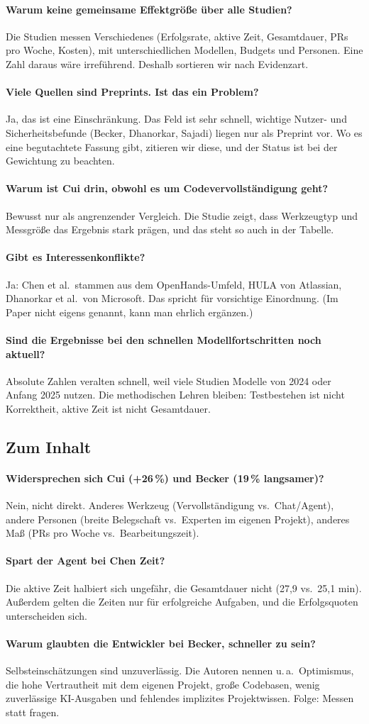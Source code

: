 \documentclass[11pt,a4paper,parskip=half]{scrartcl}
\newcommand{\frage}[2]{\paragraph{#1}#2\par}
\begin{document}
\frage{Warum keine gemeinsame Effektgröße über alle Studien?}{Die Studien messen Verschiedenes (Erfolgsrate, aktive Zeit, Gesamtdauer, PRs pro Woche, Kosten), mit unterschiedlichen Modellen, Budgets und Personen. Eine Zahl daraus wäre irreführend. Deshalb sortieren wir nach Evidenzart.}

\frage{Viele Quellen sind Preprints. Ist das ein Problem?}{Ja, das ist eine Einschränkung. Das Feld ist sehr schnell, wichtige Nutzer- und Sicherheitsbefunde (Becker, Dhanorkar, Sajadi) liegen nur als Preprint vor. Wo es eine begutachtete Fassung gibt, zitieren wir diese, und der Status ist bei der Gewichtung zu beachten.}

\frage{Warum ist Cui drin, obwohl es um Codevervollständigung geht?}{Bewusst nur als angrenzender Vergleich. Die Studie zeigt, dass Werkzeugtyp und Messgröße das Ergebnis stark prägen, und das steht so auch in der Tabelle.}

\frage{Gibt es Interessenkonflikte?}{Ja: Chen et al.\ stammen aus dem OpenHands-Umfeld, HULA von Atlassian, Dhanorkar et al.\ von Microsoft. Das spricht für vorsichtige Einordnung. (Im Paper nicht eigens genannt, kann man ehrlich ergänzen.)}

\frage{Sind die Ergebnisse bei den schnellen Modellfortschritten noch aktuell?}{Absolute Zahlen veralten schnell, weil viele Studien Modelle von 2024 oder Anfang 2025 nutzen. Die methodischen Lehren bleiben: Testbestehen ist nicht Korrektheit, aktive Zeit ist nicht Gesamtdauer.}

\subsection*{Zum Inhalt}
\frage{Widersprechen sich Cui (+26\,\%) und Becker (19\,\% langsamer)?}{Nein, nicht direkt. Anderes Werkzeug (Vervollständigung vs.\ Chat/Agent), andere Personen (breite Belegschaft vs.\ Experten im eigenen Projekt), anderes Maß (PRs pro Woche vs.\ Bearbeitungszeit).}

\frage{Spart der Agent bei Chen Zeit?}{Die aktive Zeit halbiert sich ungefähr, die Gesamtdauer nicht (27,9 vs.\ 25,1 min). Außerdem gelten die Zeiten nur für erfolgreiche Aufgaben, und die Erfolgsquoten unterscheiden sich.}

\frage{Warum glaubten die Entwickler bei Becker, schneller zu sein?}{Selbsteinschätzungen sind unzuverlässig. Die Autoren nennen u.\,a.\ Optimismus, die hohe Vertrautheit mit dem eigenen Projekt, große Codebasen, wenig zuverlässige KI-Ausgaben und fehlendes implizites Projektwissen. Folge: Messen statt fragen.}
\end{document}
